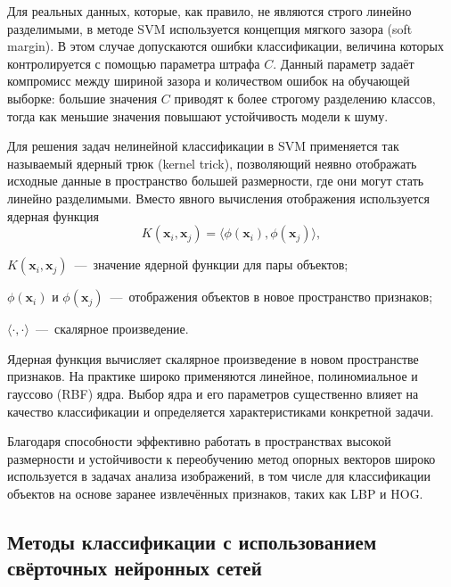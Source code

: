 Для реальных данных, которые, как правило, не являются строго линейно разделимыми, в методе SVM используется концепция мягкого зазора (soft margin). В этом случае допускаются ошибки классификации, величина которых контролируется с помощью параметра штрафа $C$. Данный параметр задаёт компромисс между шириной зазора и количеством ошибок на обучающей выборке: большие значения $C$ приводят к более строгому разделению классов, тогда как меньшие значения повышают устойчивость модели к шуму.

Для решения задач нелинейной классификации в SVM применяется так называемый ядерный трюк (kernel trick), позволяющий неявно отображать исходные данные в пространство большей размерности, где они могут стать линейно разделимыми. Вместо явного вычисления отображения используется ядерная функция
\begin{equation}
	K(\mathbf{x}_i, \mathbf{x}_j) = \langle \phi(\mathbf{x}_i), \phi(\mathbf{x}_j) \rangle,
\end{equation}
\begin{formulaexplanation}
	\item $K(\mathbf{x}_i, \mathbf{x}_j)$~---~значение ядерной функции для пары объектов;
	\item $\phi(\mathbf{x}_i)$ и $\phi(\mathbf{x}_j)$~---~отображения объектов в новое пространство признаков;
	\item $\langle \cdot, \cdot \rangle$~---~скалярное произведение.
\end{formulaexplanation}
Ядерная функция вычисляет скалярное произведение в новом пространстве признаков. На практике широко применяются линейное, полиномиальное и гауссово (RBF) ядра. Выбор ядра и его параметров существенно влияет на качество классификации и определяется характеристиками конкретной задачи.

Благодаря способности эффективно работать в пространствах высокой размерности и устойчивости к переобучению метод опорных векторов широко используется в задачах анализа изображений, в том числе для классификации объектов на основе заранее извлечённых признаков, таких как LBP и HOG.

\clearpage

\clearpage

\subsection{\texorpdfstring{Методы \mbox{классификации} с \mbox{использованием} \mbox{свёрточных} \mbox{нейронных} \mbox{сетей}}{Методы классификации с использованием свёрточных нейронных сетей}}
